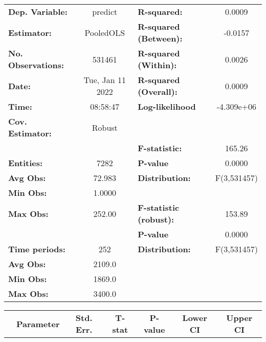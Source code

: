 \begin{center}
\begin{tabular}{lclc}
\toprule
\textbf{Dep. Variable:}    &      predict       & \textbf{  R-squared:         }   &      0.0009      \\
\textbf{Estimator:}        &     PooledOLS      & \textbf{  R-squared (Between):}  &     -0.0157      \\
\textbf{No. Observations:} &       531461       & \textbf{  R-squared (Within):}   &      0.0026      \\
\textbf{Date:}             &  Tue, Jan 11 2022  & \textbf{  R-squared (Overall):}  &      0.0009      \\
\textbf{Time:}             &      08:58:47      & \textbf{  Log-likelihood     }   &    -4.309e+06    \\
\textbf{Cov. Estimator:}   &       Robust       & \textbf{                     }   &                  \\
\textbf{}                  &                    & \textbf{  F-statistic:       }   &      165.26      \\
\textbf{Entities:}         &        7282        & \textbf{  P-value            }   &      0.0000      \\
\textbf{Avg Obs:}          &       72.983       & \textbf{  Distribution:      }   &   F(3,531457)    \\
\textbf{Min Obs:}          &       1.0000       & \textbf{                     }   &                  \\
\textbf{Max Obs:}          &       252.00       & \textbf{  F-statistic (robust):} &      153.89      \\
\textbf{}                  &                    & \textbf{  P-value            }   &      0.0000      \\
\textbf{Time periods:}     &        252         & \textbf{  Distribution:      }   &   F(3,531457)    \\
\textbf{Avg Obs:}          &       2109.0       & \textbf{                     }   &                  \\
\textbf{Min Obs:}          &       1869.0       & \textbf{                     }   &                  \\
\textbf{Max Obs:}          &       3400.0       & \textbf{                     }   &                  \\
\bottomrule
\end{tabular}
\begin{tabular}{lcccccc}
                & \textbf{Parameter} & \textbf{Std. Err.} & \textbf{T-stat} & \textbf{P-value} & \textbf{Lower CI} & \textbf{Upper CI}  \\

\end{tabular}
\end{center}
